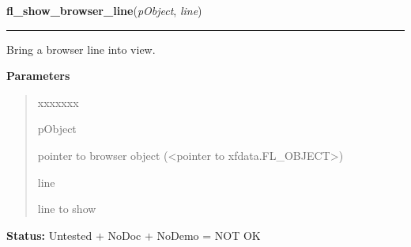 \hspace{.8\funcindent}\begin{boxedminipage}{\funcwidth}

    \raggedright \textbf{fl\_show\_browser\_line}(\textit{pObject}, \textit{line})

    \vspace{-1.5ex}

    \rule{\textwidth}{0.5\fboxrule}
\setlength{\parskip}{2ex}
    Bring a browser line into view.

\setlength{\parskip}{1ex}
      \textbf{Parameters}
      \vspace{-1ex}

      \begin{quote}
        \begin{Ventry}{xxxxxxx}

          \item[pObject]

          pointer to browser object ({\textless}pointer to 
          xfdata.FL\_OBJECT{\textgreater})

          \item[line]

          line to show

        \end{Ventry}

      \end{quote}

\textbf{Status:} Untested + NoDoc + NoDemo = NOT OK



    \end{boxedminipage}

    \label{xformslib:library:fl_set_browser_hscroll_callback}

    \vspace{0.5ex}


